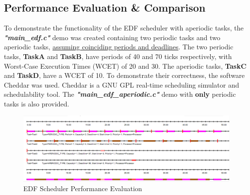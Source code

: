 \documentclass{article}
\begin{document}
\subsection{Performance Evaluation \& Comparison}
To demonstrate the functionality of the EDF scheduler with aperiodic tasks, the \textit{\textbf{"main\_edf.c"}} demo was created containing two periodic tasks and two aperiodic tasks, \ul{assuming coinciding periods and deadlines}. The two periodic tasks, \textbf{TaskA} and \textbf{TaskB}, have periods of 40 and 70 ticks respectively, with Worst-Case Execution Times (WCET) of 20 and 30. The aperiodic tasks, \textbf{TaskC} and \textbf{TaskD}, have a WCET of 10. To demonstrate their correctness, the software Cheddar was used. Cheddar is a GNU GPL real-time scheduling simulator and schedulability tool. The \textit{\textbf{"main\_edf\_aperiodic.c"}} demo with \textbf{only} periodic tasks is also provided.
\begin{figure}[H]
    \centering
    \includegraphics[width=\linewidth]{cheddar_edf_aperiodic.png}
    \caption{EDF Scheduler Performance Evaluation}
\end{figure}\noindent
\end{document}
